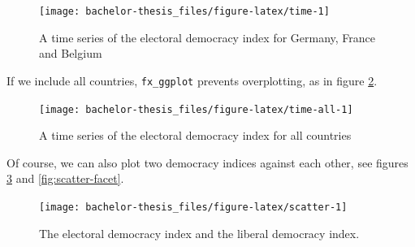 \documentclass[]{report}
\newenvironment{Shaded}{\begin{snugshade}}{\end{snugshade}}
\newcommand{\KeywordTok}[1]{\textcolor[rgb]{0.13,0.29,0.53}{\textbf{#1}}}
\newcommand{\DataTypeTok}[1]{\textcolor[rgb]{0.13,0.29,0.53}{#1}}
\newcommand{\StringTok}[1]{\textcolor[rgb]{0.31,0.60,0.02}{#1}}
\newcommand{\OperatorTok}[1]{\textcolor[rgb]{0.81,0.36,0.00}{\textbf{#1}}}
\newcommand{\NormalTok}[1]{#1}
\theoremstyle{definition}
\theoremstyle{definition}
\theoremstyle{definition}
\theoremstyle{remark}
\begin{document}
\begin{figure}

{\centering \texttt{[image: bachelor-thesis\_files/figure-latex/time-1]} 

}

\caption{A time series of the electoral democracy index for Germany, France and Belgium}\label{fig:time}
\end{figure}

If we include all countries, \texttt{fx\_ggplot} prevents overplotting,
as in figure \ref{fig:time-all}.

\begin{Shaded}
\end{Shaded}

\begin{figure}

{\centering \texttt{[image: bachelor-thesis\_files/figure-latex/time-all-1]} 

}

\caption{A time series of the electoral democracy index for all countries}\label{fig:time-all}
\end{figure}

Of course, we can also plot two democracy indices against each other,
see figures \ref{fig:scatter} and \ref{fig:scatter-facet}.

\begin{Shaded}
\end{Shaded}

\begin{figure}

{\centering \texttt{[image: bachelor-thesis\_files/figure-latex/scatter-1]} 

}

\caption{The electoral democracy index and the liberal democracy index.}\label{fig:scatter}
\end{figure}
\end{document}
